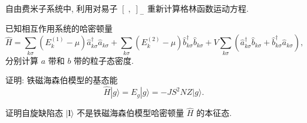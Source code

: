 \begin{question2}{}{}
自由费米子系统中, 利用对易子 $[\; ,\;]_{-}$ 重新计算格林函数运动方程.
\end{question2}

\begin{question2}{}{}
已知相互作用系统的哈密顿量
\begin{equation}
\hat{H}=\sum_{k  \sigma} (E_{k}^{(1)}-\mu) \hat{a}_{k  \sigma}^{\dagger} \hat{a}_{k  \sigma}^{}+\sum_{k  \sigma} (E_{k}^{(2)}-\mu) \hat{b}_{k  \sigma}^{\dagger} \hat{b}_{k  \sigma}^{}+V\sum_{k  \sigma} \left(\hat{a}_{k  \sigma}^{\dagger} \hat{b}_{k  \sigma}^{}+\hat{b}_{k  \sigma}^{\dagger} \hat{a}_{k  \sigma}^{}\right),
\end{equation}
分别计算 $a$ 带和 $b$ 带的粒子态密度.
\end{question2}

\begin{question2}{}{}
证明: 铁磁海森伯模型的基态能
\begin{equation}
    \hat{H}|g\rangle=E_{g}|g\rangle=-J S^{2} N Z |g\rangle.
    \end{equation}
\end{question2}

\begin{question2}{}{}
证明自旋缺陷态 $|\boldsymbol{l}\rangle$ 不是铁磁海森伯模型哈密顿量 $\hat{H}$ 的本征态.
\end{question2}

